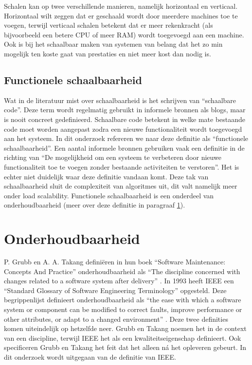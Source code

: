 Schalen kan op twee verschillende manieren, namelijk horizontaal en verticaal. Horizontaal wilt zeggen dat er geschaald wordt door meerdere machines toe te voegen, terwijl verticaal schalen betekent dat er  meer rekenkracht (als bijvoorbeeld een betere CPU of meer RAM) wordt toegevoegd aan een machine. Ook is bij het schaalbaar maken van systemen van belang dat het zo min mogelijk ten koste gaat van prestaties en niet meer kost dan nodig is.

\subsection{Functionele schaalbaarheid}
Wat in de literatuur mist over schaalbaarheid is het schrijven van \enquote{schaalbare code}. Deze term wordt regelmatig gebruikt in informele bronnen als blogs, maar is nooit concreet gedefinieerd. Schaalbare code betekent in welke mate bestaande code moet worden aangepast zodra een nieuwe functionaliteit wordt toegevoegd aan het systeem. In dit onderzoek refereren we naar deze definitie als \enquote{functionele schaalbaarheid}. Een aantal informele bronnen gebruiken vaak een definitie in de richting van \enquote{De mogelijkheid om een systeem te verbeteren door nieuwe functionaliteit toe te voegen zonder bestaande activiteiten te verstoren}. Het is echter niet duidelijk waar deze definitie vandaan komt. Deze tak van schaalbaarheid sluit de complexiteit van algoritmes uit, dit valt namelijk meer onder load scalability. Functionele schaalbaarheid is een onderdeel van onderhoudbaarheid (meer over deze definitie in paragraaf \ref{onderhoudbaarheid}).

\section{Onderhoudbaarheid} \label{onderhoudbaarheid}
P. Grubb en A. A. Takang definiëren in hun boek \enquote{Software Maintenance: Concepts And Practice} onderhoudbaarheid als \enquote{The discipline concerned with changes related to a software system after delivery} \parencite{MaintenanceConcepts}. In 1993 heeft IEEE een \enquote{Standard Glossary of Software Engineering Terminology} opgesteld. Deze begrippenlijst definieert onderhoudbaarheid als \enquote{the ease with which a software system or component can be modified to correct faults, improve performance or other attributes, or adapt to a changed environment} \parencite{SENTerminology}. Deze twee definities komen uiteindelijk op hetzelfde neer. Grubb en Takang noemen het in de context van een discipline, terwijl IEEE het als een kwaliteitseigenschap definieert. Ook specificeren Grubb en Takang het feit dat het alleen ná het opleveren gebeurt. In dit onderzoek wordt uitgegaan van de definitie van IEEE.

